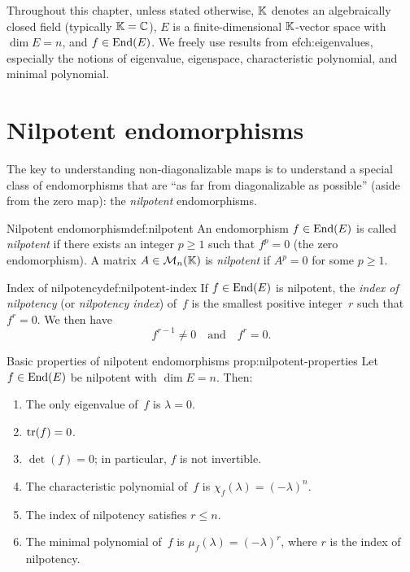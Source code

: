 Throughout this chapter, unless stated otherwise, ${\mathbb{K}}$ denotes an
algebraically closed field (typically ${\mathbb{K}} = {\mathbb{C}}$), $E$ is a
finite-dimensional ${\mathbb{K}}$-vector space with $\dim E = n$, and
$f \in \operatorname{End}(E)$.  We freely use results from 
ef{ch:eigenvalues},
especially the notions of eigenvalue, eigenspace, characteristic
polynomial, and minimal polynomial.


\section{Nilpotent endomorphisms}\label{sec:nilpotent}

The key to understanding non-diagonalizable maps is to understand a
special class of endomorphisms that are ``as far from diagonalizable as
possible'' (aside from the zero map): the \emph{nilpotent}
endomorphisms.

\begin{definition}{Nilpotent endomorphism}{def:nilpotent}
An endomorphism $f \in \operatorname{End}(E)$ is called \emph{nilpotent} if there
exists an integer $p \geq 1$ such that $f^p = 0$ (the zero
endomorphism).  A matrix $A \in \mathcal{M}_n({\mathbb{K}})$ is \emph{nilpotent} if
$A^p = 0$ for some $p \geq 1$.
\end{definition}

\begin{definition}{Index of nilpotency}{def:nilpotent-index}
If $f \in \operatorname{End}(E)$ is nilpotent, the \emph{index of nilpotency}
(or \emph{nilpotency index}) of~$f$ is the smallest positive
integer~$r$ such that $f^r = 0$.  We then have
\[
  f^{r-1} \neq 0 \quad\text{and}\quad f^r = 0.
\]
\end{definition}

\begin{proposition}{Basic properties of nilpotent endomorphisms}%
{prop:nilpotent-properties}
Let $f \in \operatorname{End}(E)$ be nilpotent with $\dim E = n$.  Then:
\begin{enumerate}[label=(\roman*)]
  \item\label{it:nilp-eigenvalue}
    The only eigenvalue of~$f$ is $\lambda = 0$.
  \item\label{it:nilp-trace}
    $\operatorname{tr}(f) = 0$.
  \item\label{it:nilp-det}
    $\det(f) = 0$; in particular, $f$ is not invertible.
  \item\label{it:nilp-charpoly}
    The characteristic polynomial of~$f$ is $\chi_f(\lambda) = (-\lambda)^n$.
  \item\label{it:nilp-index-bound}
    The index of nilpotency satisfies $r \leq n$.
  \item\label{it:nilp-minpoly}
    The minimal polynomial of~$f$ is $\mu_f(\lambda) = (-\lambda)^r$,
    where $r$ is the index of nilpotency.
\end{enumerate}
\end{proposition}

